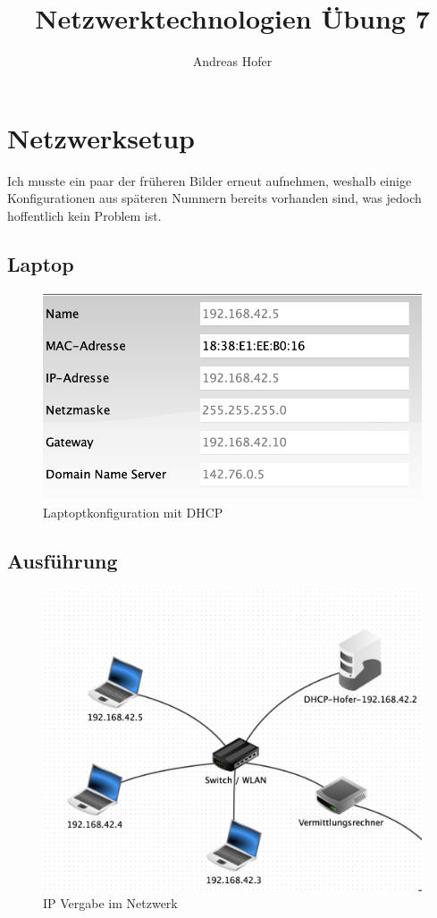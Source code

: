 \documentclass{article}
\title{\vspace{-1cm}Netzwerktechnologien Übung 7}
\author{Andreas Hofer}
\begin{document}
	\maketitle
	\section{Netzwerksetup}
	Ich musste ein paar der früheren Bilder erneut aufnehmen, weshalb einige Konfigurationen aus späteren Nummern bereits vorhanden sind, was jedoch hoffentlich kein Problem ist.
	\subsection{Laptop}
	\begin{figure}[H]
	\centering
	\includegraphics[scale=0.5]{1.1.png}
	\caption{Laptoptkonfiguration mit DHCP}
	\end{figure}
	\subsection{Ausführung}
	\begin{figure}[H]
	\centering
	\includegraphics[scale=0.5]{1.2.png}
	\caption{IP Vergabe im Netzwerk}
	\end{figure}
\end{document}
